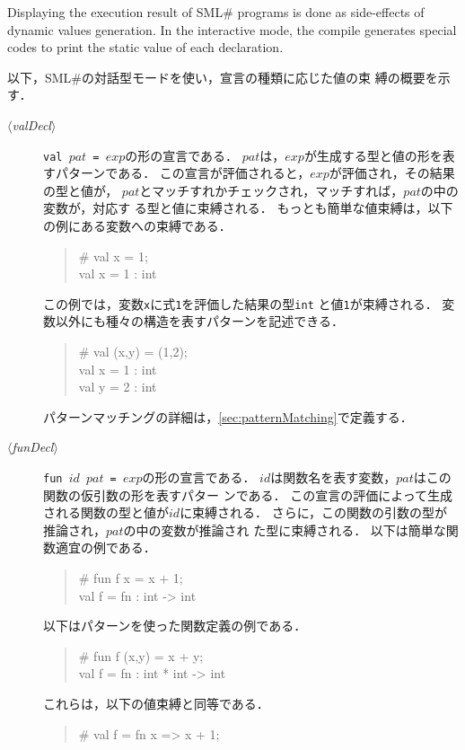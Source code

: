 \documentclass{jbook}
\newcommand{\smlsharp}{SML\#}
\newcommand{\code}[1]{\mbox{\large\tt #1}}
\newcommand{\nonterm}[1]{\mbox{$\langle$}{\it #1}\mbox{$\rangle$}}
\newenvironment{program}{\begin{quote}\begin{tt}}%
                        {\end{tt}\end{quote}}
\begin{document}
	Displaying the execution result of \smlsharp{} programs is done
as side-effects of dynamic values generation.
	In the interactive mode, the compile generates special codes 
to print the static value of each declaration.

\fi%

\ifjp%
	以下，\smlsharp{}の対話型モードを使い，宣言の種類に応じた値の束
縛の概要を示す．
\begin{description}
\item[\nonterm{valDecl}] 
	\code{val $pat$ = $exp$}の形の宣言である．
	$pat$は，$exp$が生成する型と値の形を表すパターンである．
	この宣言が評価されると，$exp$が評価され，その結果の型と値が，
$pat$とマッチすれかチェックされ，マッチすれば，$pat$の中の変数が，対応す
る型と値に束縛される．
	もっとも簡単な値束縛は，以下の例にある変数への束縛である．
\begin{program}
  \# val x = 1;\\
  val x = 1 : int
\end{program}
	この例では，変数\code{x}に式\code{1}を評価した結果の型\code{int}
と値\code{1}が束縛される．
	変数以外にも種々の構造を表すパターンを記述できる．
\begin{program}
  \# val (x,y) = (1,2);\\
  val x = 1 : int\\
  val y = 2 : int
\end{program}
	パターンマッチングの詳細は，\ref{sec:patternMatching}で定義する．
\item[\nonterm{funDecl}] 
	\code{fun $id$ $pat$ = $exp$}の形の宣言である．
	$id$は関数名を表す変数，$pat$はこの関数の仮引数の形を表すパター
ンである．
	この宣言の評価によって生成される関数の型と値が$id$に束縛される．
	さらに，この関数の引数の型が推論され，$pat$の中の変数が推論され
た型に束縛される．
	以下は簡単な関数適宜の例である．
\begin{program}
  \# fun f x = x + 1;\\
  val f = fn : int -> int
\end{program}
	以下はパターンを使った関数定義の例である．
\begin{program}
  \# fun f (x,y) = x + y;\\
  val f = fn : int * int -> int
\end{program}
	これらは，以下の値束縛と同等である．
\begin{program}
  \# val f = fn x => x + 1;\\

\end{program}
\end{description}
\end{document}

